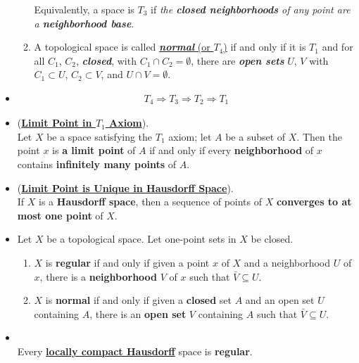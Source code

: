 \documentclass[11pt]{article}
\begin{document}
\begin{itemize}
\begin{definition}
\begin{enumerate}
Equivalently, a space is $T_3$ if \emph{the \textbf{closed neighborhoods} of any point are a \textbf{neighborhood base}}.

\item A topological space is called \underline{\emph{\textbf{normal}} (or $T_4$)} if and only if it is $T_1$ and for all $C_1$, $C_2$, \emph{\textbf{closed}}, with $C_1 \cap C_2 = \emptyset$, there are \emph{\textbf{open sets}} $U$, $V$ with $C_1 \subset U$,  $C_2 \subset V$, and $U \cap V = \emptyset$.
\end{enumerate}
\end{definition}

\item \begin{proposition}
\begin{align*}
T_4 \Rightarrow T_3 \Rightarrow T_2 \Rightarrow T_1
\end{align*}
\end{proposition}

\item \begin{proposition} (\underline{\textbf{Limit Point in $T_1$ Axiom}}). \citep{munkres2000topology} \\
Let $X$ be a space satisfying the $T_1$ axiom; let $A$ be a subset of $X$. Then the point $x$ is \textbf{a limit point} of $A$ if and only if every \textbf{neighborhood} of $x$ contains \textbf{infinitely many points} of $A$.
\end{proposition}

\item \begin{proposition} (\underline{\textbf{Limit Point is Unique in Hausdorff Space}}). \citep{munkres2000topology} \\
If $X$ is a \textbf{Hausdorff space}, then a sequence of points of $X$ \textbf{converges to at most one point} of $X$.
\end{proposition}

\item \begin{lemma}
Let $X$ be a topological space. Let one-point sets in $X$ be closed.
\begin{enumerate}
\item $X$ is \textbf{regular} if and only if given a point $x$ of $X$ and a neighborhood $U$ of $x$,
there is a \textbf{neighborhood} $V$ of $x$ such that $\bar{V} \subseteq U$.
\item $X$ is \textbf{normal} if and only if given a \textbf{closed} set $A$ and an open set $U$ containing $A$,
there is an \textbf{open set} $V$ containing $A$ such that $\bar{V}\subseteq U$.
\end{enumerate}
\end{lemma}


\item \begin{proposition}  \citep{munkres2000topology} \\
Every \underline{\textbf{locally compact Hausdorff}} space is \textbf{regular}.
\end{proposition}
\end{itemize}
\end{document}
